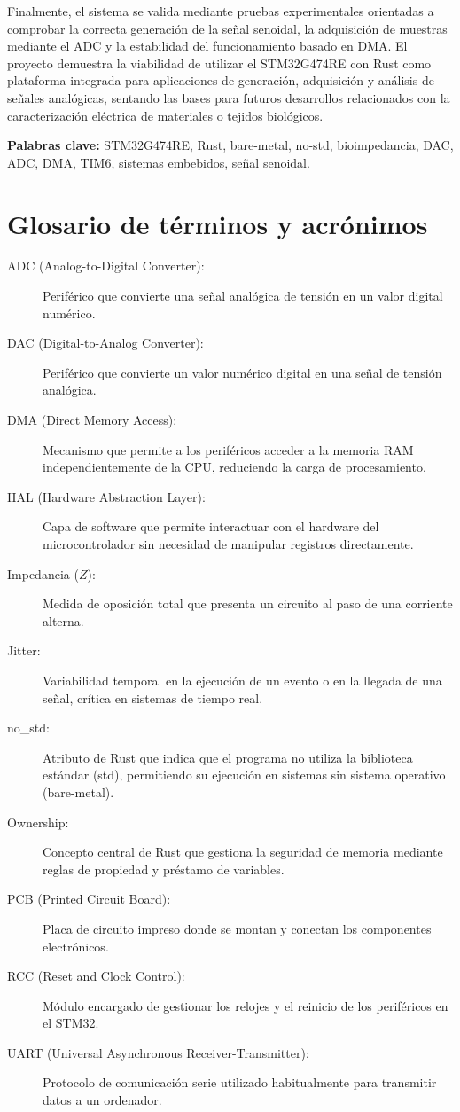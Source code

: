 \documentclass[11pt,a4paper]{article}
\begin{document}
Finalmente, el sistema se valida mediante pruebas experimentales orientadas a comprobar la correcta generación de la señal senoidal, la adquisición de muestras mediante el ADC y la estabilidad del funcionamiento basado en DMA. El proyecto demuestra la viabilidad de utilizar el STM32G474RE con Rust como plataforma integrada para aplicaciones de generación, adquisición y análisis de señales analógicas, sentando las bases para futuros desarrollos relacionados con la caracterización eléctrica de materiales o tejidos biológicos.

\bigskip

\noindent\textbf{Palabras clave:} STM32G474RE, Rust, bare-metal, no-std, bioimpedancia, DAC, ADC, DMA, TIM6, sistemas embebidos, señal senoidal.

\newpage

\tableofcontents
\section*{Glosario de términos y acrónimos}

\begin{description}
    \item[ADC (Analog-to-Digital Converter):] Periférico que convierte una señal analógica de tensión en un valor digital numérico.
    \item[DAC (Digital-to-Analog Converter):] Periférico que convierte un valor numérico digital en una señal de tensión analógica.
    \item[DMA (Direct Memory Access):] Mecanismo que permite a los periféricos acceder a la memoria RAM independientemente de la CPU, reduciendo la carga de procesamiento.
    \item[HAL (Hardware Abstraction Layer):] Capa de software que permite interactuar con el hardware del microcontrolador sin necesidad de manipular registros directamente.
    \item[Impedancia ($Z$):] Medida de oposición total que presenta un circuito al paso de una corriente alterna.
    \item[Jitter:] Variabilidad temporal en la ejecución de un evento o en la llegada de una señal, crítica en sistemas de tiempo real.
    \item[no\_std:] Atributo de Rust que indica que el programa no utiliza la biblioteca estándar (std), permitiendo su ejecución en sistemas sin sistema operativo (bare-metal).
    \item[Ownership:] Concepto central de Rust que gestiona la seguridad de memoria mediante reglas de propiedad y préstamo de variables.
    \item[PCB (Printed Circuit Board):] Placa de circuito impreso donde se montan y conectan los componentes electrónicos.
    \item[RCC (Reset and Clock Control):] Módulo encargado de gestionar los relojes y el reinicio de los periféricos en el STM32.
    \item[UART (Universal Asynchronous Receiver-Transmitter):] Protocolo de comunicación serie utilizado habitualmente para transmitir datos a un ordenador.
\end{description}
\newpage
\end{document}

